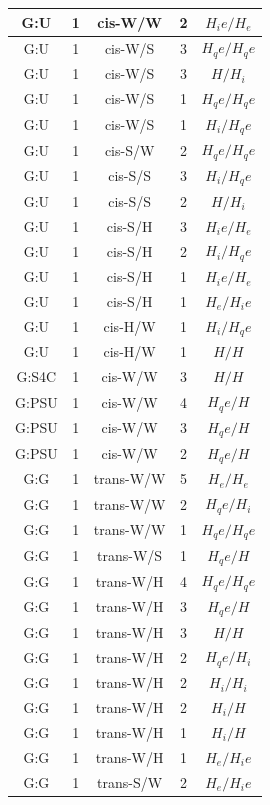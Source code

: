 \begin{center}
\begin{longtable}{c|c|c|c|c}
G:U & 1 & cis-W/W & 2 & $H_ie/H_e$ \\  \hline
G:U & 1 & cis-W/S & 3 & $H_qe/H_qe$ \\  \hline
G:U & 1 & cis-W/S & 3 & $H/H_i$ \\  \hline
G:U & 1 & cis-W/S & 1 & $H_qe/H_qe$ \\  \hline
G:U & 1 & cis-W/S & 1 & $H_i/H_qe$ \\  \hline
G:U & 1 & cis-S/W & 2 & $H_qe/H_qe$ \\  \hline
G:U & 1 & cis-S/S & 3 & $H_i/H_qe$ \\  \hline
G:U & 1 & cis-S/S & 2 & $H/H_i$ \\  \hline
G:U & 1 & cis-S/H & 3 & $H_ie/H_e$ \\  \hline
G:U & 1 & cis-S/H & 2 & $H_i/H_qe$ \\  \hline
G:U & 1 & cis-S/H & 1 & $H_ie/H_e$ \\  \hline
G:U & 1 & cis-S/H & 1 & $H_e/H_ie$ \\  \hline
G:U & 1 & cis-H/W & 1 & $H_i/H_qe$ \\  \hline
G:U & 1 & cis-H/W & 1 & $H/H$ \\  \hline
G:S4C & 1 & cis-W/W & 3 & $H/H$ \\  \hline
G:PSU & 1 & cis-W/W & 4 & $H_qe/H$ \\  \hline
G:PSU & 1 & cis-W/W & 3 & $H_qe/H$ \\  \hline
G:PSU & 1 & cis-W/W & 2 & $H_qe/H$ \\  \hline
G:G & 1 & trans-W/W & 5 & $H_e/H_e$ \\  \hline
G:G & 1 & trans-W/W & 2 & $H_qe/H_i$ \\  \hline
G:G & 1 & trans-W/W & 1 & $H_qe/H_qe$ \\  \hline
G:G & 1 & trans-W/S & 1 & $H_qe/H$ \\  \hline
G:G & 1 & trans-W/H & 4 & $H_qe/H_qe$ \\  \hline
G:G & 1 & trans-W/H & 3 & $H_qe/H$ \\  \hline
G:G & 1 & trans-W/H & 3 & $H/H$ \\  \hline
G:G & 1 & trans-W/H & 2 & $H_qe/H_i$ \\  \hline
G:G & 1 & trans-W/H & 2 & $H_i/H_i$ \\  \hline
G:G & 1 & trans-W/H & 2 & $H_i/H$ \\  \hline
G:G & 1 & trans-W/H & 1 & $H_i/H$ \\  \hline
G:G & 1 & trans-W/H & 1 & $H_e/H_ie$ \\  \hline
G:G & 1 & trans-S/W & 2 & $H_e/H_ie$ \\  \hline

\end{longtable}
\end{center}
